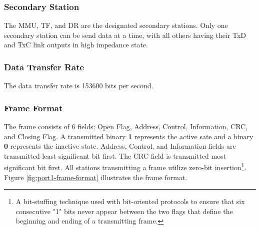 \documentclass[]{article}
\begin{document}
\subsubsection {Secondary Station}
 The MMU, TF, and DR are the designated secondary stations. Only one secondary station can be send data at a time, with all others having their TxD and TxC link outputs in high impedance state.
 
\subsubsection {Data Transfer Rate}
 The data transfer rate is 153600 bits per second.
 
\subsubsection {Frame Format}

The frame consists of 6 fields: Open Flag, Address, Control, Information, CRC, and Closing Flag. A transmitted binary \textbf{1} represents the active sate and a binary \textbf{0} represents the inactive state. Address, Control, and Information fields are transmitted least significant bit first. The CRC field is transmitted most significant bit first. All stations transmitting a frame utilize zero-bit insertion\footnote{A bit-stuffing technique used with bit-oriented protocols to ensure that six consecutive "1" bits never appear between the two flags that define the beginning and ending of a transmitting frame.}. Figure \ref{fig:port1-frame-format} illustrates the frame format. 
\end{document}
